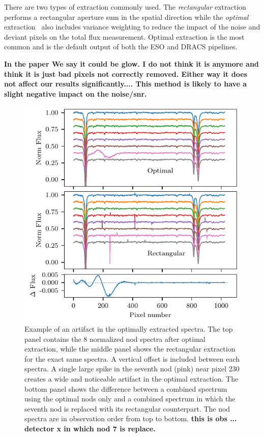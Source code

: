 There are two types of extraction commonly used. The \emph{rectangular} extraction performs a rectangular aperture sum in the spatial direction while the \emph{optimal} extraction~\citep{horne_optimal_1986} also includes variance weighting to reduce the impact of the noise and deviant pixels on the total flux measurement. Optimal extraction is the most common and is the default output of both the ESO and DRACS pipelines.


\textbf{In the paper We say it could be glow. I do not think it is anymore and think it is just bad pixels not correctly removed. Either way it does not affect our results significantly....
This method is likely to have a slight negative impact on the noise/snr.}


\begin{figure}
    \centering
    \includegraphics[width=\hsize]{figures/reduction/Bad_pixel_replacement}
    \caption{Example of an artifact in the optimally extracted spectra. The top panel contains the 8 normalized nod spectra after optimal extraction, while the middle panel shows the rectangular extraction for the exact same spectra. A vertical offset is included between each spectra. A single large spike in the seventh nod (pink) near pixel 230 creates a wide and noticeable artifact in the optimal extraction. The bottom panel shows the difference between a combined spectrum using the optimal nods only and a combined spectrum in which the seventh nod is replaced with its rectangular counterpart. The nod spectra are in observation order from top to bottom.  \textbf{this is obs ... detector x in which nod 7 is replace.}}
    \label{fig:badpixelreplacement}
\end{figure}

